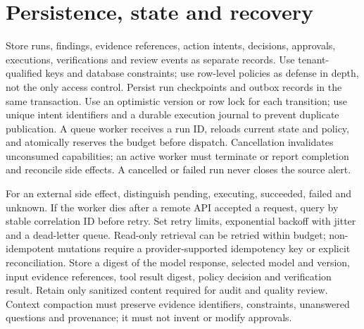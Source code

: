 \documentclass[11pt,letterpaper]{article}
\begin{document}
\section{Persistence, state and recovery}
Store runs, findings, evidence references, action intents, decisions, approvals, executions, verifications and review events as separate records. Use tenant-qualified keys and database constraints; use row-level policies as defense in depth, not the only access control. Persist run checkpoints and outbox records in the same transaction. Use an optimistic version or row lock for each transition; use unique intent identifiers and a durable execution journal to prevent duplicate publication. A queue worker receives a run ID, reloads current state and policy, and atomically reserves the budget before dispatch. Cancellation invalidates unconsumed capabilities; an active worker must terminate or report completion and reconcile side effects. A cancelled or failed run never closes the source alert.

For an external side effect, distinguish pending, executing, succeeded, failed and unknown. If the worker dies after a remote API accepted a request, query by stable correlation ID before retry. Set retry limits, exponential backoff with jitter and a dead-letter queue. Read-only retrieval can be retried within budget; non-idempotent mutations require a provider-supported idempotency key or explicit reconciliation. Store a digest of the model response, selected model and version, input evidence references, tool result digest, policy decision and verification result. Retain only sanitized content required for audit and quality review. Context compaction must preserve evidence identifiers, constraints, unanswered questions and provenance; it must not invent or modify approvals.
\end{document}
